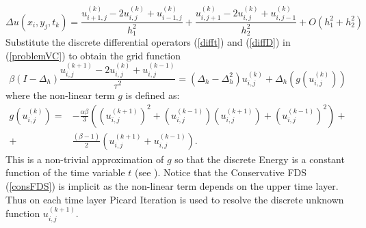 \documentclass[%
 aip,
cp,  %
 amsmath,amssymb,%
 reprint,%
]{revtex4-2}
\newcommand{\be}{\begin{equation}}
\newcommand{\ee}{\end{equation}}
\newcommand{\rf}[1]{(\ref{#1})}
\begin{document}
\be\label{diffD}
\Delta u(x_i, y_j, t_k )  = \frac{ u^{(k)}_{i+1, j} - 2u^{(k)}_{i,j} + u^{(k)}_{i-1,j} }{h_1^2} + \frac{ u^{(k)}_{i, j+1} - 2u^{(k)}_{i,j} + u^{(k)}_{i,j-1} }{h_2^2} + O(h_1^2 + h_2^2) 
\ee
Substitute the discrete differential operators \rf{difft} and \rf{diffD} in \rf{problemVC} to obtain the grid function
\be\label{consFDS}
\beta (I-\Delta_h)\frac{ u^{(k+1)}_{i, j} - 2u^{(k)}_{i,j} + u^{(k-1)}_{i,j} }{\tau^2} = (\Delta_h - \Delta_h^2)u^{(k)}_{i,j} + \Delta_h(g(u^{(k)}_{i,j}))
\ee
%
where the non-linear term $g$ is defined as:
\begin{align}
g(u^{(k)}_{i,j})=& -\frac{\alpha \beta} { 3 } \left( (u^{(k+1)}_{i,j})^2 + (u^{(k-1)}_{i,j})(u^{(k+1)}_{i,j}) + (u^{(k-1)}_{i,j})^2 \right) + \nonumber\\
+&\frac{ (\beta - 1 )}{ 2 }\left( u^{(k+1)}_{i,j} + u^{(k-1)}_{i,j} \right).
\end{align}
This is a non-trivial approximation of $g$ so that the discrete Energy is a constant function of the time variable $t$ (see \cite{ref20}). Notice that the Conservative FDS \rf{consFDS} is implicit as the non-linear term depends on the upper time layer. Thus on each time layer Picard Iteration is used to resolve the discrete unknown function $u^{(k+1)}_{i,j}$.
\end{document}
